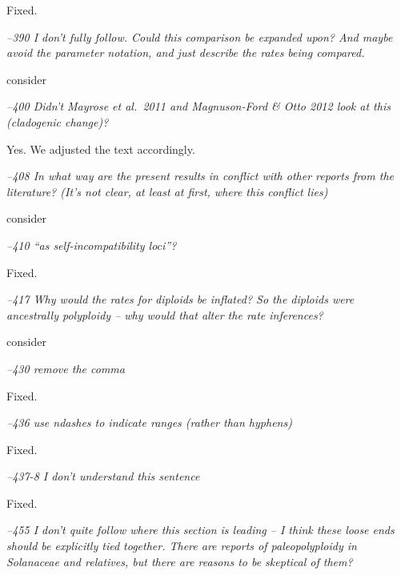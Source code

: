 \documentclass[11pt]{article}
\renewenvironment{quote}{\bigskip\noindent\itshape\ignorespaces}{\smallskip}
\begin{document}
Fixed.

\begin{quote}
--390  I don't fully follow.
Could this comparison be expanded upon?
And maybe avoid the parameter notation, and just describe the rates being compared.
\end{quote}

consider %

\begin{quote}
--400  Didn't Mayrose et al.\ 2011 and Magnuson-Ford \& Otto 2012 look at this (cladogenic change)?
\end{quote}

Yes. We adjusted the text accordingly.

\begin{quote}
--408  In what way are the present results in conflict with other reports from the literature?
(It's not clear, at least at first, where this conflict lies)
\end{quote}

consider %

\begin{quote}
--410  ``as self-incompatibility loci''?
\end{quote}

Fixed.

\begin{quote}
--417  Why would the rates for diploids be inflated?
So the diploids were ancestrally polyploidy -- why would that alter the rate inferences?
\end{quote}

consider %

\begin{quote}
--430  remove the comma
\end{quote}

Fixed.

\begin{quote}
--436  use ndashes to indicate ranges (rather than hyphens)
\end{quote}

Fixed.

\begin{quote}
--437-8 I don't understand this sentence
\end{quote}

Fixed.

\begin{quote}
--455  I don't quite follow where this section is leading -- I think these loose ends should be explicitly tied together.
There are reports of paleopolyploidy in Solanaceae and relatives, but there are reasons to be skeptical of them?
\end{quote}
\end{document}
